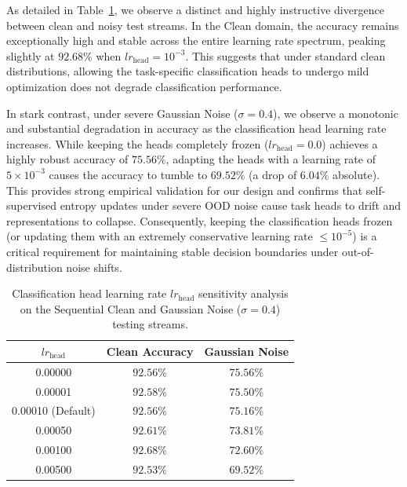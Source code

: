 \documentclass{article}
\theoremstyle{plain}
\theoremstyle{definition}
\theoremstyle{remark}
\begin{document}
As detailed in Table~\ref{tab:head_sweep}, we observe a distinct and highly instructive divergence between clean and noisy test streams. In the Clean domain, the accuracy remains exceptionally high and stable across the entire learning rate spectrum, peaking slightly at $92.68\%$ when $lr_{\text{head}} = 10^{-3}$. This suggests that under standard clean distributions, allowing the task-specific classification heads to undergo mild optimization does not degrade classification performance.

In stark contrast, under severe Gaussian Noise ($\sigma = 0.4$), we observe a monotonic and substantial degradation in accuracy as the classification head learning rate increases. While keeping the heads completely frozen ($lr_{\text{head}} = 0.0$) achieves a highly robust accuracy of $75.56\%$, adapting the heads with a learning rate of $5 \times 10^{-3}$ causes the accuracy to tumble to $69.52\%$ (a drop of $6.04\%$ absolute). This provides strong empirical validation for our design and confirms that self-supervised entropy updates under severe OOD noise cause task heads to drift and representations to collapse. Consequently, keeping the classification heads frozen (or updating them with an extremely conservative learning rate $\le 10^{-5}$) is a critical requirement for maintaining stable decision boundaries under out-of-distribution noise shifts.

\begin{table}[t]
\caption{Classification head learning rate $lr_{\text{head}}$ sensitivity analysis on the Sequential Clean and Gaussian Noise ($\sigma = 0.4$) testing streams.}
\label{tab:head_sweep}
\vskip 0.1in
\begin{center}
\begin{small}
\scshape
\begin{tabular}{ccc}
\toprule
$lr_{\text{head}}$ & Clean Accuracy & Gaussian Noise \\
\midrule
0.00000 & $92.56\%$ & $\mathbf{75.56\%}$ \\
0.00001 & $\mathbf{92.58\%}$ & $75.50\%$ \\
0.00010 (Default) & $92.56\%$ & $75.16\%$ \\
0.00050 & $92.61\%$ & $73.81\%$ \\
0.00100 & $92.68\%$ & $72.60\%$ \\
0.00500 & $92.53\%$ & $69.52\%$ \\
\bottomrule
\end{tabular}
\end{small}
\end{center}
\vskip -0.1in
\end{table}
\end{document}
